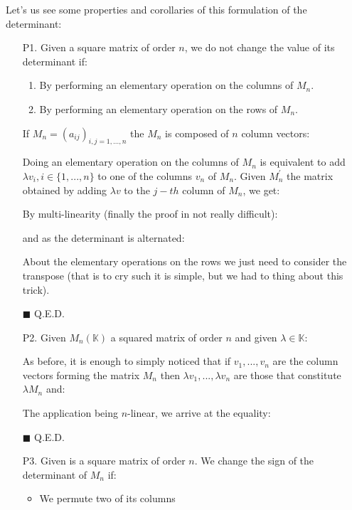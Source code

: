 	Let's us see some properties and corollaries of this formulation of the determinant:
	\begin{enumerate}
		\item[P1.] Given a square matrix of order $n$, we do not change the value of its determinant if:
		\begin{enumerate}
			\item By performing an elementary operation on the columns of $M_n$.

			\item By performing an elementary operation on the rows of $M_n$.
		\end{enumerate}
		\begin{dem}
		If $M_n=(a_{ij})_{i,j=1,...,n}$ the $M_n$ is composed of $n$ column vectors:
		
		Doing an elementary operation on the columns of $M_n$ is equivalent to add $\lambda v_i,i \in \{1,...,n\}$ to one of the columns $v_n$ of $M_n$. Given $M_n^{\prime}$ the matrix obtained by adding $\lambda v$ to the $j-th$ column of $M_n$, we get:
		
		By multi-linearity (finally the proof in not really difficult):
		
		and as the determinant is alternated:
		
		About the elementary operations on the rows we just need to consider the transpose (that is to cry such it is simple, but we had to thing about this trick).
		\begin{flushright}
			$\blacksquare$  Q.E.D.
		\end{flushright}
		\end{dem}
		
		\item[P2.] Given $M_n(\mathbb{K})$ a squared matrix of order $n$ and given $\lambda \in \mathbb{K}$:
		
		\begin{dem}
		As before, it is enough to simply noticed that if $v_1,...,v_n$ are the column vectors forming the matrix $M_n$ then $\lambda v_1,...,\lambda v_n$ are those that constitute $\lambda M_n$ and:
		
		The application being $n$-linear, we arrive at the equality:
		
		\begin{flushright}
			$\blacksquare$  Q.E.D.
		\end{flushright}
		\end{dem}
		
		\item[P3.] Given is a square matrix of order $n$. We change the sign of the determinant of $M_n$ if:
		\begin{itemize}
			\item We permute two of its columns
	

\end{itemize}
\end{enumerate}
